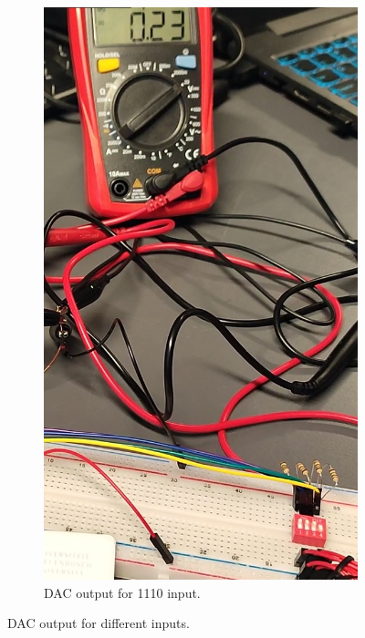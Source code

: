 \begin{figure}[H]
\begin{subfigure}[]{0.3\textwidth}
\includegraphics[width=\linewidth]{./Figures/DAC_Prac_1110.jpeg}
\caption{DAC output for 1110 input.} 			
\label{subfig:dac_prac_1110}	
\end{subfigure}
\caption{DAC output for different inputs.}
\label{fig:dac_prac}
\end{figure}

\clearpage
